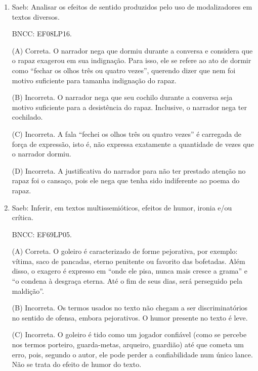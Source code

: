 \begin{enumerate}
(C) Incorreta. O narrador tentou manter-se atento, mas foi vencido pelo
cansaço.

(D) Correta. O narrador cochilou durante a conversa, o que deixou o
rapaz indignado. Entretanto, ele não percebeu que se tratou de cansaço e
não de indiferença.


\item

Saeb: Analisar os efeitos de sentido produzidos pelo uso de
modalizadores em textos diversos.

BNCC: EF08LP16.

(A) Correta. O narrador nega que dormiu durante a conversa e considera
que o rapaz exagerou em sua indignação. Para isso, ele se refere ao ato
de dormir como ``fechar os olhos três ou quatro vezes'', querendo dizer
que nem foi motivo suficiente para tamanha indignação do rapaz.

(B) Incorreta. O narrador nega que seu cochilo durante a conversa seja
motivo suficiente para a desistência do rapaz. Inclusive, o narrador
nega ter cochilado.

(C) Incorreta. A fala ``fechei os olhos três ou quatro vezes'' é carregada
de força de expressão, isto é, não expressa exatamente a quantidade de
vezes que o narrador dormiu.

(D) Incorreta. A justificativa do narrador para não ter prestado atenção
no rapaz foi o cansaço, pois ele nega que tenha sido indiferente ao
poema do rapaz.


\item

Saeb: Inferir, em textos multissemióticos, efeitos de humor, ironia e/ou
crítica.

BNCC: EF69LP05.

(A) Correta. O goleiro é caracterizado de forme pejorativa, por exemplo:
vítima, saco de pancadas, eterno penitente ou favorito das bofetadas.
Além disso, o exagero é expresso em ``onde ele pisa, nunca mais cresce a
grama'' e ``o condena à desgraça eterna. Até o fim de seus dias, será
perseguido pela maldição''.

(B) Incorreta. Os termos usados no texto não chegam a ser
discriminatórios no sentido de ofensa, embora pejorativos. O humor
presente no texto é leve.

(C) Incorreta. O goleiro é tido como um jogador confiável (como se
percebe nos termos porteiro, guarda-metas, arqueiro, guardião) até que
cometa um erro, pois, segundo o autor, ele pode perder a confiabilidade
num único lance. Não se trata do efeito de humor do texto.


\end{enumerate}
